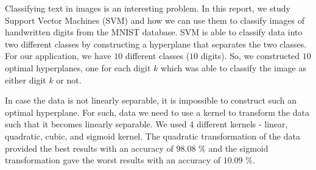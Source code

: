
\noindent
{Classifying text in images is an interesting problem. In this report, we study Support Vector Machines (SVM)\cite{statistical-learning} and how we can use them to classify images of handwritten digits from the MNIST database\cite{mnist}. SVM is able to classify data into two different classes by constructing a hyperplane that separates the two classes. For our application, we have $10$ different classes ($10$ digits). So, we constructed $10$ optimal hyperplanes, one for each digit $k$ which was able to classify the image as either digit $k$ or not.}

\noindent
{In case the data is not linearly separable, it is impossible to construct such an optimal hyperplane. For such, data we need to use a kernel to transform the data such that it becomes linearly separable. We used $4$ different kernels - linear, quadratic, cubic, and sigmoid kernel. The quadratic transformation of the data provided the best results with an accuracy of $98.08$ \% and the sigmoid transformation gave the worst results with an accuracy of $10.09$ \%.}